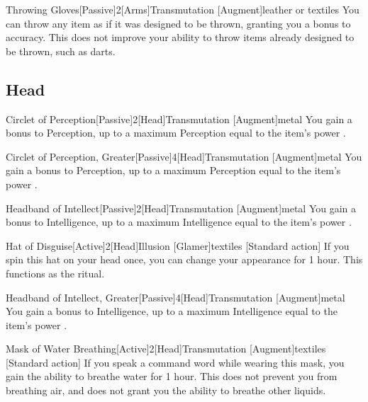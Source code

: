 \begin{magicitemdef}{Throwing Gloves}[Passive]{2}[Arms]{Transmutation [Augment]}{leather or textiles}
     You can throw any item as if it was designed to be thrown, granting you a  bonus to accuracy.
    This does not improve your ability to throw items already designed to be thrown, such as darts.
\end{magicitemdef}

\subsection{Head}

\begin{magicitemdef}{Circlet of Perception}[Passive]{2}[Head]{Transmutation [Augment]}{metal}
     You gain a  bonus to Perception, up to a maximum Perception equal to the item's power .
\end{magicitemdef}

\begin{magicitemdef}{Circlet of Perception, Greater}[Passive]{4}[Head]{Transmutation [Augment]}{metal}
     You gain a  bonus to Perception, up to a maximum Perception equal to the item's power .
\end{magicitemdef}

\begin{magicitemdef}{Headband of Intellect}[Passive]{2}[Head]{Transmutation [Augment]}{metal}
     You gain a  bonus to Intelligence, up to a maximum Intelligence equal to the item's power .
\end{magicitemdef}

\begin{magicitemdef}{Hat of Disguise}[Active]{2}[Head]{Illusion [Glamer]}{textiles}
    [Standard action] If you spin this hat on your head once, you can change your appearance for 1 hour.
    This functions as the  ritual.
\end{magicitemdef}

\begin{magicitemdef}{Headband of Intellect, Greater}[Passive]{4}[Head]{Transmutation [Augment]}{metal}
     You gain a  bonus to Intelligence, up to a maximum Intelligence equal to the item's power .
\end{magicitemdef}

\begin{magicitemdef}{Mask of Water Breathing}[Active]{2}[Head]{Transmutation [Augment]}{textiles}
    [Standard action] If you speak a command word while wearing this mask, you gain the ability to breathe water for 1 hour.
    This does not prevent you from breathing air, and does not grant you the ability to breathe other liquids.
\end{magicitemdef}


